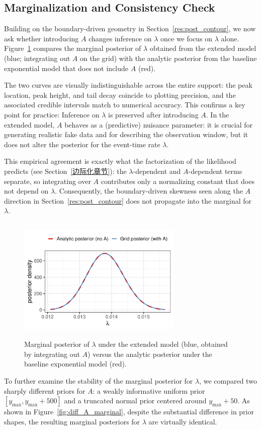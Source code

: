 \subsection{Marginalization and Consistency Check}
\label{res:marginal}
Building on the boundary-driven geometry in Section~\ref{res:post_contour}, we now ask whether introducing $A$ changes inference on $\lambda$ once we focus on $\lambda$ alone. Figure~\ref{fig:marginal} compares the marginal posterior of $\lambda$ obtained from the extended model (blue; integrating out $A$ on the grid) with the analytic posterior from the baseline exponential model that does not include $A$ (red).

The two curves are visually indistinguishable across the entire support: the peak location, peak height, and tail decay coincide to plotting precision, and the associated credible intervals match to numerical accuracy. This confirms a key point for practice: Inference on $\lambda$ is preserved after introducing $A$. In the extended model, $A$ behaves as a (predictive) nuisance parameter: it is crucial for generating realistic fake data and for describing the observation window, but it does not alter the posterior for the event-time rate $\lambda$.

This empirical agreement is exactly what the factorization of the likelihood predicts (see Section~\ref{边际化章节}): the $\lambda$-dependent and $A$-dependent terms separate, so integrating over $A$ contributes only a normalizing constant that does not depend on $\lambda$. Consequently, the boundary-driven skewness seen along the $A$ direction in Section~\ref{res:post_contour} does not propagate into the marginal for $\lambda$.

\begin{figure}[H]
    \centering
    \includegraphics[height=6cm, width=0.7\textwidth]{images/lambda_marginal_compare.pdf}
    \caption{{\small Marginal posterior of $\lambda$ under the extended model (blue, obtained by integrating out $A$) versus the analytic posterior under the baseline exponential model (red).}}
    \label{fig:marginal}
\end{figure}
To further examine the stability of the marginal posterior for $\lambda$, we compared two sharply different priors for $A$: a weakly informative uniform prior $[y_{\max}, y_{\max}+500]$ and a truncated normal prior centered around $y_{\max}+50$. As shown in Figure~\ref{fig:diff_A_marginal}, despite the substantial difference in prior shapes, the resulting marginal posteriors for $\lambda$ are virtually identical.

